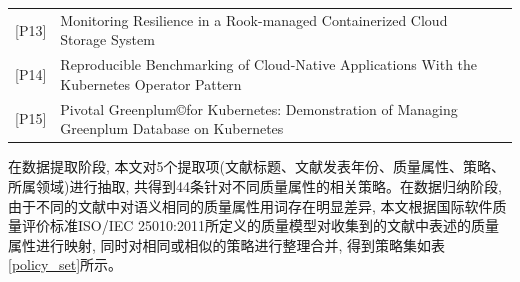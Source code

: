 {\begin{longtable}[h]{m{40pt} m{280pt} m{40pt}<{\centering}}
        [P13]&Monitoring Resilience in a Rook-managed Containerized Cloud Storage System&\cite{baumann2019monitoring}\\
        
        [P14]&Reproducible Benchmarking of Cloud-Native Applications With the Kubernetes Operator Pattern&\cite{henning2021reproducible}\\
        
        [P15]&Pivotal Greenplum©for Kubernetes: Demonstration of Managing Greenplum Database on Kubernetes&\cite{patel2019pivotal}\\
        \bottomrule
    \end{longtable}
}

在数据提取阶段, 本文对5个提取项(文献标题、文献发表年份、质量属性、策略、所属领域)进行抽取, 共得到44条针对不同质量属性的相关策略。在数据归纳阶段, 由于不同的文献中对语义相同的质量属性用词存在明显差异, 本文根据国际软件质量评价标准ISO/IEC 25010:2011\footnotemark[1]所定义的质量模型对收集到的文献中表述的质量属性进行映射, 同时对相同或相似的策略进行整理合并, 得到策略集如表\ref{policy_set}所示。

